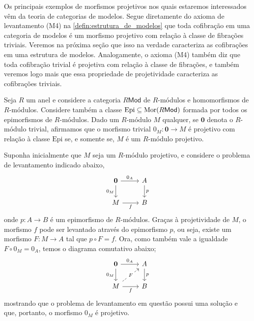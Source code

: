 \begin{exem}\label{exem:cofibs_sao_morfismos_proj}
  Os principais exemplos de morfismos projetivos nos quais estaremos interessados vêm da teoria de categorias de modelos.
  Segue diretamente do axioma de levantamento (M4) na \cref{defin:estrutura_de_modelos} que toda cofibração em uma categoria de modelos é um morfismo projetivo com relação à classe de fibrações triviais.
  Veremos na próxima seção que isso na verdade caracteriza as cofibrações em uma estrutura de modelos.
  Analogamente, o axioma (M4) também diz que toda cofibração trivial é projetiva com relação à classe de fibrações, e também veremos logo mais que essa propriedade de projetividade caracteriza as cofibrações triviais.
\end{exem}

\begin{exem}\label{exem:morfismo_zero_proj_sse_modulo_proj}
  Seja $R$ um anel e considere a categoria $R\mathsf{Mod}$ de $R$-módulos e homomorfismos de $R$-módulos.
  Considere também a classe $\mathrm{Epi} \subseteq \mathrm{Mor}(R\mathsf{Mod})$ formada por todos os epimorfismos de $R$-módulos.
  Dado um $R$-módulo $M$ qualquer, se $\mathbf{0}$ denota o $R$-módulo trivial, afirmamos que o morfismo trivial $0_M: \mathbf{0} \to M$ é projetivo com relação à classe $\mathrm{Epi}$ se, e somente se, $M$ é um $R$-módulo projetivo.

  Suponha inicialmente que $M$ seja um $R$-módulo projetivo, e considere o problema de levantamento indicado abaixo,
  \begin{displaymath}
    \begin{tikzcd}
      \mathbf{0}
      \arrow[r, "0_A"]
      \arrow[d, "0_M" swap]
      & A
      \arrow[d, "p"]
      \\ M
      \arrow[r, "f" swap]
      & B
    \end{tikzcd}
  \end{displaymath}
  onde $p: A \to B$ é um epimorfismo de $R$-módulos.
  Graças à projetividade de $M$, o morfismo $f$ pode ser levantado através do epimorfismo $p$, ou seja, existe um morfismo $F: M \to A$ tal que $p \circ F = f$.
  Ora, como também vale a igualdade $F \circ 0_M = 0_A$, temos o diagrama comutativo abaixo;
  \begin{displaymath}
    \begin{tikzcd}
      \mathbf{0}
      \arrow[r, "0_A"]
      \arrow[d, "0_M" swap]
      & A
      \arrow[d, "p"]
      \\ M
      \arrow[r, "f" swap]
      \arrow[ru, dashed, "F" description]
      & B
    \end{tikzcd}
  \end{displaymath}
  mostrando que o problema de levantamento em questão possui uma solução e que, portanto, o morfismo $0_M$ é projetivo.


\end{exem}
